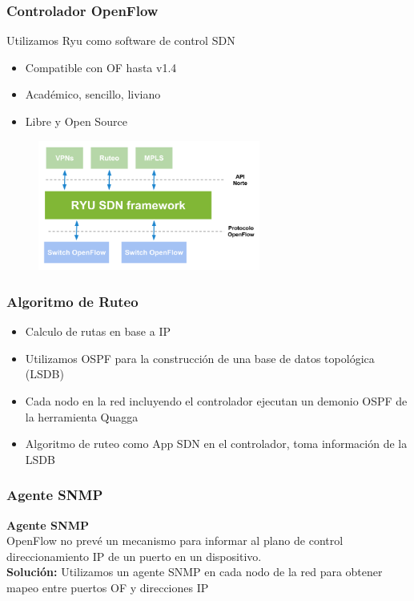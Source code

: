 \documentclass{beamer}
\begin{document}
\begin{frame}
\frametitle{Controlador OpenFlow} 

Utilizamos Ryu como software de control SDN

\begin{itemize}
\item Compatible con OF hasta v1.4
\item Acad\'emico, sencillo, liviano
\item Libre y Open Source
\end{itemize}

\begin{figure}[H]
\centering
\includegraphics[width=0.65\textwidth]{imagenes/ryuarch.png}
\end{figure}

\end{frame}

\begin{frame}
\frametitle{Algoritmo de Ruteo} 

\begin{itemize}
\item Calculo de rutas en base a IP
\item Utilizamos OSPF para la construcci\'on de una base de datos topol\'ogica (LSDB)
\item Cada nodo en la red incluyendo el controlador ejecutan un demonio OSPF de la herramienta Quagga
\item Algoritmo de ruteo como App SDN en el controlador, toma informaci\'on de la LSDB
\end{itemize}

\end{frame}

\begin{frame}
\frametitle{Agente SNMP} 

\textbf{Agente SNMP} \\
OpenFlow no prev\'e un mecanismo para informar al plano de control direccionamiento IP de un puerto en un dispositivo. \\

\vspace{0.5cm}
\textbf{Soluci\'on:}  Utilizamos un agente SNMP en cada nodo de la red para obtener mapeo entre puertos OF y direcciones IP

\end{frame}
\end{document}

